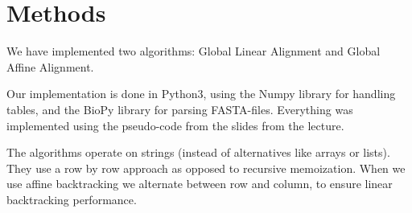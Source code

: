 \section{Methods}

We have implemented two algorithms: Global Linear Alignment and Global Affine Alignment. 

Our implementation is done in Python3, using the Numpy library for handling tables, and the BioPy library for parsing FASTA-files.
Everything was implemented using the pseudo-code from the slides from the lecture. 

The algorithms operate on strings (instead of alternatives like arrays or lists). They use a row by row approach as opposed to recursive memoization. 
When we use affine backtracking we alternate between row and column, to ensure linear backtracking performance. 